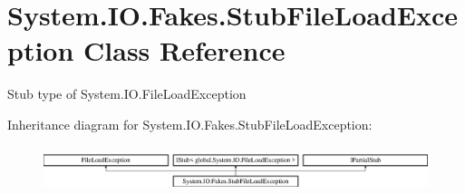 \hypertarget{class_system_1_1_i_o_1_1_fakes_1_1_stub_file_load_exception}{\section{System.\-I\-O.\-Fakes.\-Stub\-File\-Load\-Exception Class Reference}
\label{class_system_1_1_i_o_1_1_fakes_1_1_stub_file_load_exception}
}


Stub type of System.\-I\-O.\-File\-Load\-Exception 


Inheritance diagram for System.\-I\-O.\-Fakes.\-Stub\-File\-Load\-Exception\-:\begin{figure}[H]
\begin{center}
\leavevmode
\includegraphics[height=1.357576cm]{class_system_1_1_i_o_1_1_fakes_1_1_stub_file_load_exception}
\end{center}
\end{figure}
